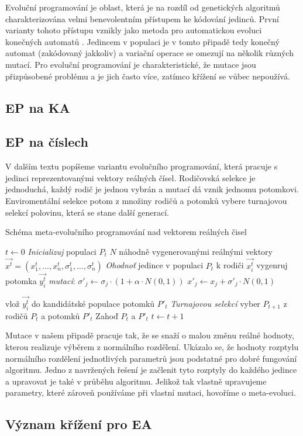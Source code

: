 Evoluční programování je oblast, která je na rozdíl od genetických algoritmů charakterizována velmi benevolentním přístupem ke kódování jedinců. První varianty tohoto přístupu vznikly jako metoda pro automatickou evoluci konečných automatů \cite{fogel}. Jedincem v populaci je v tomto připadě tedy konečný automat (zakódovaný jakkoliv) a variační operace se omezují na několik různých mutací. Pro evoluční programování je charakteristické, že mutace jsou přizpůsobené problému a je jich často více, zatímco křížení se vůbec nepoužívá. 

\subsection{EP na KA}

\subsection{EP na číslech}

V dalším textu popíšeme variantu evolučního programování, která pracuje s jedinci reprezentovanými vektory reálných čísel. Rodičovská selekce je jednoduchá, každý rodič je jednou vybrán a mutací dá vznik jednomu potomkovi. Enviromentální selekce potom z množiny rodičů a potomků vybere turnajovou selekcí polovinu, která se stane další generací. 

\begin{algorithm}
\caption{Schéma meta-evolučního programování nad vektorem reálných čisel}
\label{obrep}
\begin{algorithmic}
\State $t \gets 0$
\State \emph{Inicializuj} populaci $P_t$ $N$ náhodně vygenerovanými reálnými vektory $\vec{x^t}=(x_1^t,\dots,x_n^t,\sigma_1^t,\dots,\sigma_n^t)$
\State \emph{Ohodnoť} jedince v populaci $P_t$
\State 	k rodiči $\vec{x_i^t}$ vygenruj potomka $\vec{y_i^t}$ \emph{mutací}:
\State $\sigma'_j \gets \sigma_j \cdot (1+\alpha \cdot N(0,1))$
\State $x'_j \gets x_j + \sigma'_j \cdot N(0,1)$

\EndFor
\State vlož $\vec{y_i^t}$ do kandidátské populace potomků $P'_t$
\EndFor
\State 	\emph{Turnajovou selekcí} vyber $P_{t+1}$ z rodičů $P_t$ a potomků $P'_t$
\State 	Zahoď $P_t$ a $P'_t$
\State $t \gets t+1$
\EndWhile
\EndProcedure
\end{algorithmic}
\end{algorithm}
 
Mutace v našem připadě pracuje tak, že se snaží o malou změnu reálné hodnoty, kterou realizuje výběrem z normálního rozdělení. Ukázalo se, že hodnoty rozptylu normálního rozdělení jednotlivých parametrů jsou podstatné pro dobré fungování algoritmu. Jedno z navržených řešení je začlenit tyto rozptyly do každého jedince a upravovat je také v průběhu algoritmu. Jelikož tak vlastně upravujeme parametry, které zároveň používáme při vlastní mutaci, hovoříme o meta-evoluci.

\subsection{Význam křížení pro EA}
